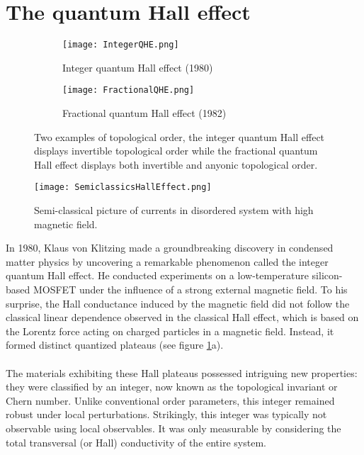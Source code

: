 \section{The quantum Hall effect}\label{sec:the-quantum-hall-effect}
\begin{figure}
		\centering
		\begin{subfigure}[b]{0.45\textwidth}
			\centering
			\texttt{[image: IntegerQHE.png]}
			\caption{Integer quantum Hall effect (1980)}
		\end{subfigure}
		\hfill
		\begin{subfigure}[b]{0.45\textwidth}
			\centering
			\texttt{[image: FractionalQHE.png]}
			\caption{Fractional quantum Hall effect (1982)}
		\end{subfigure}
		\caption{Two examples of topological order, the integer quantum Hall effect displays invertible topological order while the fractional quantum Hall effect displays both invertible and anyonic topological order.}
		\label{fig:TopologicalOrderFigures}
\end{figure}
\begin{figure}
	\centering
	\texttt{[image: SemiclassicsHallEffect.png]}
	\caption{Semi-classical picture of currents in disordered system with high magnetic field.}
	\label{fig:SemiclassisInHallEffect}
\end{figure}
In 1980, Klaus von Klitzing made a groundbreaking discovery in condensed matter physics by uncovering a remarkable phenomenon called the integer quantum Hall effect. He conducted experiments on a low-temperature silicon-based MOSFET under the influence of a strong external magnetic field. To his surprise, the Hall conductance induced by the magnetic field did not follow the classical linear dependence observed in the classical Hall effect, which is based on the Lorentz force acting on charged particles in a magnetic field. Instead, it formed distinct quantized plateaus (see figure \ref{fig:TopologicalOrderFigures}a).
\\\\
The materials exhibiting these Hall plateaus possessed intriguing new properties: they were classified by an integer, now known as the topological invariant or Chern number. Unlike conventional order parameters, this integer remained robust under local perturbations. Strikingly, this integer was typically not observable using local observables. It was only measurable by considering the total transversal (or Hall) conductivity of the entire system.
